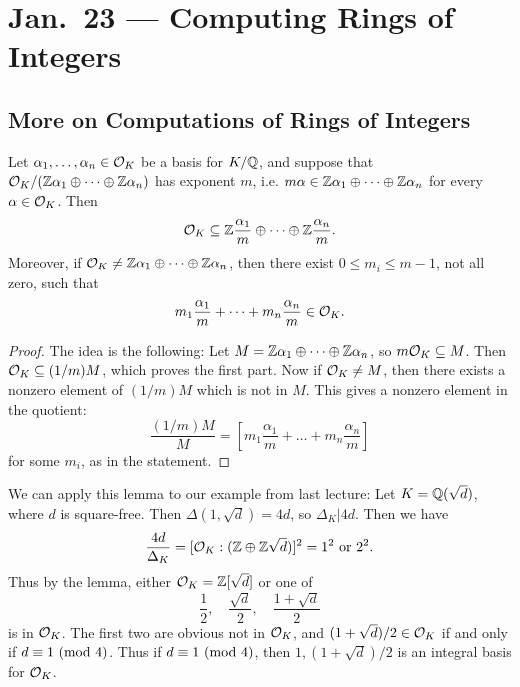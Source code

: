 \chapter{Jan.~23 --- Computing Rings of Integers}

\section{More on Computations of Rings of Integers}
\begin{lemma}
  Let $\alpha_1, \dots, \alpha_n \in \mathcal{O}_K$ be a
  basis for $K / \mathbb{Q}$, and suppose that
  $\mathcal{O}_K / (\mathbb{Z} \alpha_1 \oplus \dots \oplus \mathbb{Z} \alpha_n)$
  has exponent $m$, i.e. $m \alpha \in \mathbb{Z} \alpha_1 \oplus \dots \oplus \mathbb{Z} \alpha_n$
  for every $\alpha \in \mathcal{O}_K$. Then
  \[
    \mathcal{O}_K \subseteq \mathbb{Z} \frac{\alpha_1}{m} \oplus \dots \oplus \mathbb{Z} \frac{\alpha_n}{m}.
  \]
  Moreover, if $\mathcal{O}_K \ne \mathbb{Z} \alpha_1 \oplus \dots \oplus \mathbb{Z} \alpha_n$,
  then there exist $0 \le m_i \le m - 1$, not all
  zero, such that
  \[
    m_1 \frac{\alpha_1}{m} + \dots + m_n \frac{\alpha_n}{m} \in \mathcal{O}_K.
  \]
\end{lemma}

\begin{proof}
  The idea is the following: Let
  $M = \mathbb{Z} \alpha_1 \oplus \dots \oplus \mathbb{Z} \alpha_n$,
  so $m \mathcal{O}_K \subseteq M$. Then
  $\mathcal{O}_K \subseteq (1 / m) M$, which proves the
  first part. Now if $\mathcal{O}_K \ne M$, then there
  exists a nonzero element of $(1 / m) M$ which is
  not in $M$. This gives a nonzero element in the
  quotient:
  \[
    \frac{(1 / m) M}{M}
    = \left[m_1 \frac{\alpha_1}{m} + \dots + m_n \frac{\alpha_n}{m}\right]
  \]
  for some $m_i$, as in the statement.
\end{proof}

\begin{example}
  We can apply this lemma to our example from last
  lecture: Let $K = \mathbb{Q}(\sqrt{d})$, where
  $d$ is square-free. Then $\Delta(1, \sqrt{d}) = 4d$,
  so $\Delta_K | 4d$. Then we have
  \[
    \frac{4d}{\Delta_K} = [\mathcal{O}_K : (\mathbb{Z} \oplus \mathbb{Z} \sqrt{d})]^2
    = 1^2 \text{ or } 2^2.
  \]
  Thus by the lemma, either $\mathcal{O}_K = \mathbb{Z}[\sqrt{d}]$
  or one of
  \[
    \frac{1}{2}, \quad \frac{\sqrt{d}}{2}, \quad \frac{1 + \sqrt{d}}{2}
  \]
  is in $\mathcal{O}_K$. The first two are obvious not in
  $\mathcal{O}_K$, and $(1 + \sqrt{d}) / 2 \in \mathcal{O}_K$ if
  and only if $d \equiv 1 \ (\mathrm{mod}\ 4)$. Thus if
  $d \equiv 1 \ (\mathrm{mod}\ 4)$, then
  $1, (1 + \sqrt{d}) / 2$ is an integral basis for
  $\mathcal{O}_K$.
\end{example}

